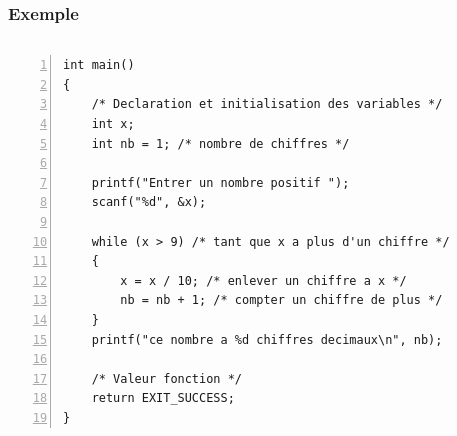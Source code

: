 \documentclass[xcolor=pdftex,svgnames,table]{beamer}
\begin{document}
\begin{frame}[fragile]
  \frametitle{Exemple}
\begin{columns}
  \begin{column}[t]{3.7cm}
 \begin{lstlisting}[numbers=left,basicstyle=\ttfamily\scriptsize]
int main()
{
    /* Declaration et initialisation des variables */
    int x;
    int nb = 1; /* nombre de chiffres */

    printf("Entrer un nombre positif ");
    scanf("%d", &x);

    while (x > 9) /* tant que x a plus d'un chiffre */
    {
        x = x / 10; /* enlever un chiffre a x */
        nb = nb + 1; /* compter un chiffre de plus */
    }
    printf("ce nombre a %d chiffres decimaux\n", nb);

    /* Valeur fonction */
    return EXIT_SUCCESS;
}
\end{lstlisting}
\vspace{.4cm}
  \end{column}
\begin{column}[t]{4cm}
\scriptsize
 \end{column}
\end{columns}
\end{frame}
\end{document}
